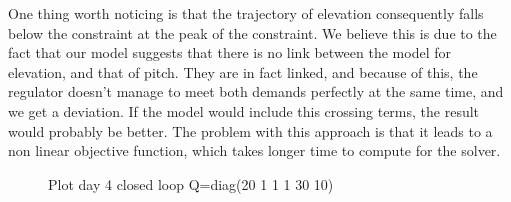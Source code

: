 One thing worth noticing is that the trajectory of elevation consequently falls below the constraint at the peak of the constraint. We believe this is due to the fact that our model suggests that there is no link between the model for elevation, and that of pitch. They are in fact linked, and because of this, the regulator doesn't manage to meet both demands perfectly at the same time, and we get a deviation. If the model would include this crossing terms, the result would probably be better. The problem with this approach is that it leads to a non linear objective function, which takes longer time to compute for the solver.
\begin{figure}[htb]
	\centering
	\caption{Plot day 4 closed loop Q=diag(20 1 1 1 30 10)}
	\label{fig:day4_cl_plot_20_1_1_1_30_10}
\end{figure}




